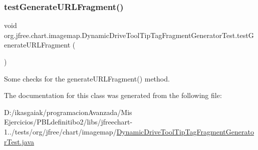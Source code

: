 \subsubsection{\texorpdfstring{test\+Generate\+U\+R\+L\+Fragment()}{testGenerateURLFragment()}}
{\footnotesize\ttfamily void org.\+jfree.\+chart.\+imagemap.\+Dynamic\+Drive\+Tool\+Tip\+Tag\+Fragment\+Generator\+Test.\+test\+Generate\+U\+R\+L\+Fragment (\begin{DoxyParamCaption}{ }\end{DoxyParamCaption})}

Some checks for the generate\+U\+R\+L\+Fragment() method. 

The documentation for this class was generated from the following file\+:\begin{DoxyCompactItemize}
\item 
D\+:/ikasgaiak/programacion\+Avanzada/\+Mis Ejercicios/\+P\+B\+Ldefinitibo2/libs/jfreechart-\/1../tests/org/jfree/chart/imagemap/\mbox{\hyperlink{_dynamic_drive_tool_tip_tag_fragment_generator_test_8java}{Dynamic\+Drive\+Tool\+Tip\+Tag\+Fragment\+Generator\+Test.\+java}}\end{DoxyCompactItemize}
